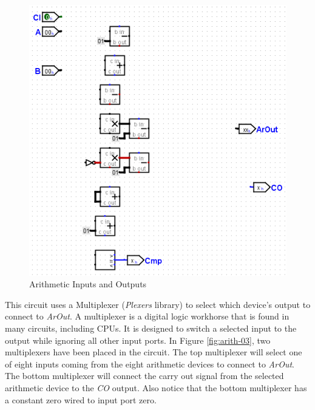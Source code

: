 \begin{figure}[H]
	\centering
	\includegraphics[width=\maxwidth{.95\linewidth}]{gfx/arith-02}
	\caption{Arithmetic Inputs and Outputs}
	\label{fig:arith-02}
\end{figure}

This circuit uses a Multiplexer (\textit{Plexers} library) to select which device's output to connect to \textit{ArOut}. A multiplexer is a digital logic workhorse that is found in many circuits, including \acp{CPU}. It is designed to switch a selected input to the output while ignoring all other input ports. In Figure \ref{fig:arith-03}, two multiplexers have been placed in the circuit. The top multiplexer will select one of eight inputs coming from the eight arithmetic devices to connect to \textit{ArOut}. The bottom multiplexer will connect the carry out signal from the selected arithmetic device to the \textit{CO} output. Also notice that the bottom multiplexer has a constant zero wired to input port zero. 


